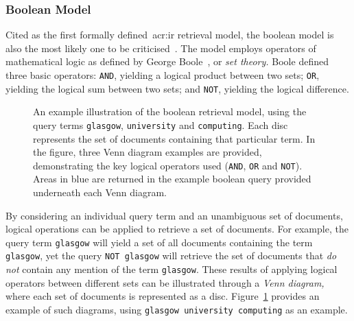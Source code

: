 \subsubsection{Boolean Model}
Cited as the first formally defined~\gls{acr:ir} retrieval model, the boolean model is also the most likely one to be criticised~\citep{hiemstra2009ir_models}. The model employs operators of mathematical logic as defined by George Boole~\citep{boole1847mathematical}, or \emph{set theory.} Boole defined three basic operators: \texttt{AND}, yielding a logical product between two sets; \texttt{OR}, yielding the logical sum between two sets; and \texttt{NOT}, yielding the logical difference.

\begin{figure}[t!]
    \centering
    \caption[Venn diagrams illustrating boolean retrieval]{An example illustration of the boolean retrieval model, using the query terms \texttt{glasgow}, \texttt{university} and \texttt{computing}. Each disc represents the set of documents containing that particular term. In the figure, three Venn diagram examples are provided, demonstrating the key logical operators used (\texttt{AND}, \texttt{OR} and \texttt{NOT}). Areas in blue are returned in the example boolean query provided underneath each Venn diagram.}
    \label{fig:boolean}
\end{figure}

By considering an individual query term and an unambiguous set of documents, logical operations can be applied to retrieve a set of documents. For example, the query term \texttt{glasgow} will yield a set of all documents containing the term \texttt{glasgow}, yet the query \texttt{NOT glasgow} will retrieve the set of documents that \emph{do not} contain any mention of the term \texttt{glasgow}. These results of applying logical operators between different sets can be illustrated through a \emph{Venn diagram,} where each set of documents is represented as a disc. Figure~\ref{fig:boolean} provides an example of such diagrams, using \texttt{glasgow university computing} as an example.

